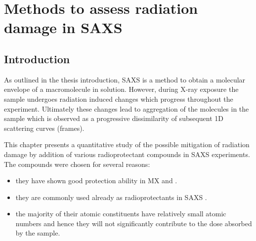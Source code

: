 \chapter{Methods to assess radiation damage in SAXS}
\label{chap:Methods to assess radiation damage in SAXS}

\section{Introduction}
\label{sec:Introduction - SAXS}
 As outlined in the thesis introduction, SAXS is a method to obtain a molecular envelope of a macromolecule in solution.
 However, during X-ray exposure the sample undergoes radiation induced changes which progress throughout the experiment.
 Ultimately these changes lead to aggregation of the molecules in the sample which is observed as a progressive dissimilarity of subsequent 1D scattering curves (frames).

 This chapter presents a quantitative study of the possible mitigation of radiation damage by addition of various radioprotectant compounds in SAXS experiments. The compounds were chosen for several reasons:
 \begin{itemize}
     \item they have shown good protection ability in MX \cite{allan2012} and \cite{southworth2007radioprotectant}.
     \item they are commonly used already as radioprotectants in SAXS \cite{grishaev2012sample}.
     \item the majority of their atomic constituents have relatively small atomic numbers and hence they will not significantly contribute to the dose absorbed by the sample.
 \end{itemize}
